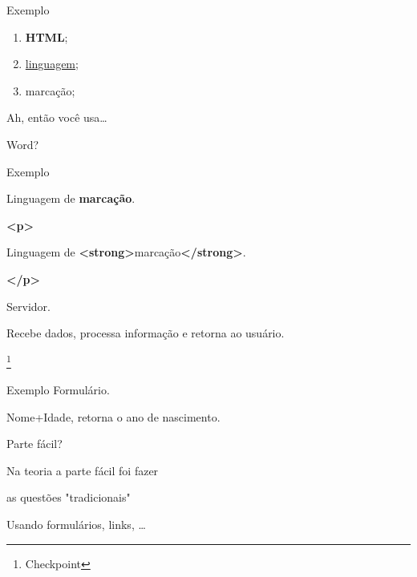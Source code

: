 \documentclass[xcolor=dvipsnames]{beamer}
\begin{document}
  \begin{frame}{Exemplo}
    \huge

    \begin{enumerate}
      \item \textbf{HTML};
      \item \underline{linguagem};
      \item marcação;
    \end{enumerate}
  \end{frame}

  \begin{frame}
    \normalsize Ah, então você usa\ldots

    \Huge Word?
  \end{frame}

  \begin{frame}{Exemplo}
    \vspace{1cm}

    \Huge Linguagem de \textbf{marcação}.

    \vspace{2cm}

    \normalsize

    \textbf{<p>}

    Linguagem de \textbf{<strong>}marcação\textbf{</strong>}.

    \textbf{</p>}
  \end{frame}

  \begin{frame}
    \Huge Servidor.

    \normalsize Recebe dados, processa informação e retorna ao
    usuário.

    \let\thefootnote\relax\footnote{Checkpoint}
  \end{frame}

  \begin{frame}{Exemplo}
    \Huge Formulário.

    \normalsize Nome+Idade, retorna o ano de nascimento.
  \end{frame}

  \begin{frame}{Parte fácil?}
    \begin{center}
      \Large Na teoria a parte fácil foi fazer

      \vspace{1cm}

      \Huge as questões "tradicionais"

      \vspace{1cm}

      \Large Usando formulários, links, \ldots
    \end{center}
  \end{frame}
\end{document}
